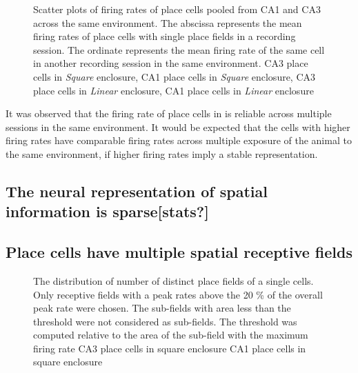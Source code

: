 \begin{figure}[htb!]
{}

\label{fig:rateremapping}
\caption[Rate Remapping]{Scatter plots of firing rates of place cells pooled from CA1 and CA3  across the same environment. The abscissa represents the mean firing rates of place cells with single place fields in a recording session. The ordinate represents the mean firing rate of the same cell in another recording session in the same environment.  CA3 place cells in \emph{Square} enclosure,  CA1 place cells in \emph{Square} enclosure,  CA3 place cells in \emph{Linear} enclosure,  CA1 place cells in \emph{Linear} enclosure}
\end{figure}

It was observed that the firing rate of place cells in is reliable across multiple sessions in the same environment. It would be expected that the cells with higher firing rates have comparable firing rates across multiple exposure of the animal to the same environment, if higher firing rates imply a stable representation. 

\subsection*{The neural representation of spatial information is sparse[stats?]}

\subsection*{Place cells have multiple spatial receptive fields}
\begin{figure}[htb!]
\label{fig:nsubfields}
\caption[Multiple receptive fields of Place Cells]{The distribution of number of distinct place fields of a single cells. Only receptive fields with a peak rates above the 20 \% of the overall peak rate were chosen. The sub-fields with area less than the threshold were not considered as sub-fields. The threshold was computed relative to the area of the sub-field with the maximum firing rate  CA3 place cells in square enclosure  CA1 place cells in square enclosure}
\end{figure}

